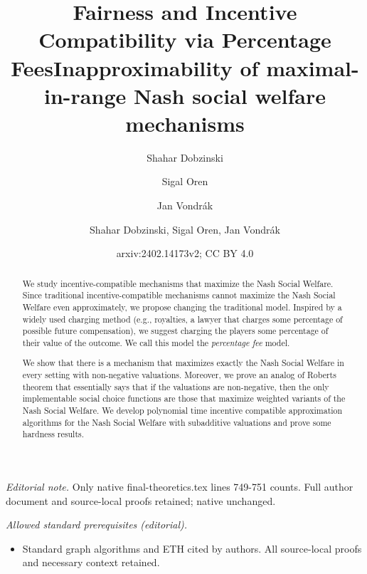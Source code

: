 \documentclass{article}
\author{Shahar Dobzinski \and Sigal Oren \and Jan Vondrák}\date{}
\title{Fairness and Incentive Compatibility via Percentage Fees}
\title{Inapproximability of maximal-in-range Nash social welfare mechanisms}
\author{Shahar Dobzinski, Sigal Oren, Jan Vondrák}
\date{arxiv:2402.14173v2; CC BY 4.0}
\begin{document}
\maketitle
\noindent\textit{Editorial note.} Only native final-theoretics.tex lines 749-751 counts. Full author document and source-local proofs retained; native unchanged.\par\medskip
\noindent\textit{Allowed standard prerequisites (editorial).}\begin{itemize}
\item Standard graph algorithms and ETH cited by authors. All source-local proofs and necessary context retained.
\end{itemize}\medskip




\maketitle

\begin{abstract}
We study incentive-compatible mechanisms that maximize the Nash Social Welfare. Since traditional incentive-compatible mechanisms cannot maximize the Nash Social Welfare even approximately, we propose changing the traditional model. Inspired by a widely used charging method (e.g., royalties, a lawyer that charges some percentage of possible future compensation), we suggest charging the players some percentage of their value of the outcome. We call this model the \emph{percentage fee} model.

We show that there is a mechanism that maximizes exactly the Nash Social Welfare in every setting with non-negative valuations. Moreover, we prove an analog of Roberts theorem that essentially says that if the valuations are non-negative, then the only implementable social choice functions are those that maximize weighted variants of the Nash Social Welfare. We develop polynomial time incentive compatible approximation algorithms for the Nash Social Welfare with subadditive valuations and prove some hardness results. 
\end{abstract}
\end{document}
